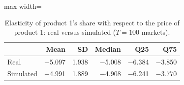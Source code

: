 \begin{table}[H]
\centering\small
\caption{Elasticity of product 1's share with respect to the price of product 1: real versus simulated ($T=100$ markets).}\label{tab:q8d_cell_11}
\begin{adjustbox}{max width=\linewidth}
\begin{tabular}{lrrrrr}
\toprule
 & Mean & SD & Median & Q25 & Q75 \\
\midrule
Real & $-$5.097 & 1.938 & $-$5.008 & $-$6.384 & $-$3.850 \\
Simulated & $-$4.991 & 1.889 & $-$4.908 & $-$6.241 & $-$3.770 \\
\bottomrule
\end{tabular}
\end{adjustbox}
\par\vspace{3pt}{\footnotesize Element $(1,1)$ of the elasticity matrix $\partial s_j/\partial p_k\cdot p_k/s_j$ across the 100 markets; simulated uses the Q8c estimates, real uses the true parameters.}
\end{table}
